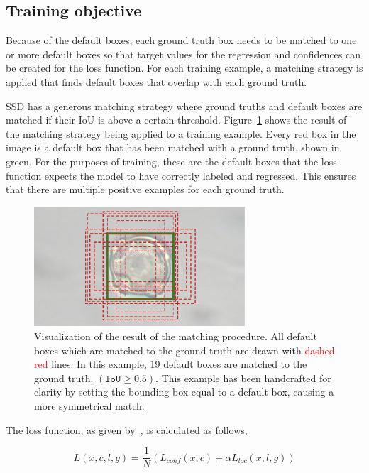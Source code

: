 \subsection{Training objective}
Because of the default boxes, each ground truth box needs to be matched to one or more default boxes so that target values for the regression and confidences can be created for the loss function.
For each training example, a matching strategy is applied that finds default boxes that overlap with each ground truth.

SSD has a generous matching strategy where ground truths and default boxes are matched if their IoU is above a certain threshold.
Figure~\ref{fig:priors} shows the result of the matching strategy being applied to a training example.
Every red box in the image is a default box that has been matched with a ground truth, shown in green.
For the purposes of training, these are the default boxes that the loss function expects the model to have correctly labeled and regressed.
This ensures that there are multiple positive examples for each ground truth.

\begin{figure}[htbp]
  \centering
  \includegraphics[width=0.7\textwidth]{figs/method/priors_matching.pdf}
  \caption[Default box matching]{Visualization of the result of the matching procedure.
  All default boxes which are matched to the \textcolor{nicegreen}{ground truth} are drawn with \textcolor{red}{dashed red} lines. In this example, 19 default boxes are matched to the ground truth. \((\texttt{IoU}\ge 0.5)\). This example has been handcrafted for clarity by setting the bounding box equal to a default box, causing a more symmetrical match.
}\label{fig:priors}
\end{figure}
The loss function, as given by\ \cite{liu_ssd_2016}, is calculated as follows,

\begin{equation}\label{eq:loss}
  L(x,c,l,g)=\frac{1}{N}\left( L_{conf}(x,c) + \alpha L_{loc}(x,l,g)\right)
\end{equation}

